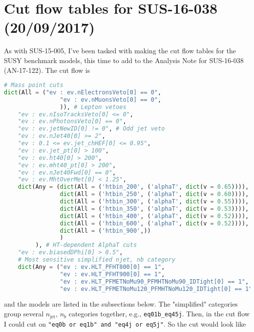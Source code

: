 \newpage
\section{Cut flow tables for SUS-16-038 (20/09/2017)}
\label{sec:cutflowtables2016paper}

As with SUS-15-005, I've been tasked with making the cut flow tables for the SUSY benchmark models, this time to add to the Analysis Note for SUS-16-038 (AN-17-122). The cut flow is

\begin{lstlisting}[belowskip=-0.7cm, language=python]
# Mass point cuts
dict(All = ("ev : ev.nElectronsVeto[0] == 0",
                "ev : ev.nMuonsVeto[0] == 0",
                )), # Lepton vetoes                                                                                                                        
    "ev : ev.nIsoTracksVeto[0] <= 0",
    "ev : ev.nPhotonsVeto[0] == 0",
    "ev : ev.jetNewID[0] != 0", # Odd jet veto 
    "ev : ev.nJet40[0] >= 2",
    "ev : 0.1 <= ev.jet_chHEF[0] <= 0.95",
    "ev : ev.jet_pt[0] > 100",
    "ev : ev.ht40[0] > 200",
    "ev : ev.mht40_pt[0] > 200",
    "ev : ev.nJet40Fwd[0] == 0",
    "ev : ev.MhtOverMet[0] < 1.25",
    dict(Any = (dict(All = ('htbin_200', ('alphaT', dict(v = 0.65)))),
                dict(All = ('htbin_250', ('alphaT', dict(v = 0.60)))),
                dict(All = ('htbin_300', ('alphaT', dict(v = 0.55)))),
                dict(All = ('htbin_350', ('alphaT', dict(v = 0.53)))),
                dict(All = ('htbin_400', ('alphaT', dict(v = 0.52)))),
                dict(All = ('htbin_600', ('alphaT', dict(v = 0.52)))),
                dict(All = ('htbin_900',))
                )
         ), # HT-dependent AlphaT cuts                                                                                                                     
    "ev : ev.biasedDPhi[0] > 0.5",
    # Most sensitive simplified njet, nb category
    dict(Any = ("ev : ev.HLT_PFHT800[0] == 1",
                "ev : ev.HLT_PFHT900[0] == 1",
                "ev : ev.HLT_PFMETNoMu90_PFMHTNoMu90_IDTight[0] == 1",
                "ev : ev.HLT_PFMETNoMu120_PFMHTNoMu120_IDTight[0] == 1")), # HLTs, needed only for LLP models
\end{lstlisting}

and the models are listed in the subsections below. The "simplified" categories group several $n_{\mathrm{jet}}$, $n_b$ categories together, e.g., \texttt{eq01b\_eq45j}. Then, in the cut flow I could cut on \texttt{"eq0b or eq1b" and "eq4j or eq5j"}. So the cut would look like

